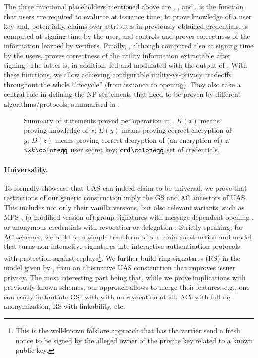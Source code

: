 The three functional placeholders mentioned above are \fissue, \feval, and
\finsp. \fissue is the function that users are required to evaluate at issuance
time, to prove knowledge of a user key and, potentially, claims over attributes
in previously obtained credentials. \feval is computed at signing time by the
user, and controls and proves correctness of the information learned by
verifiers. Finally, \finsp, although  computed also at signing time by the
users, proves correctness of the utility information extractable after signing.
The latter is, in addition, fed and modulated with the output of \feval. With
these functions, we allow achieving configurable utility-vs-privacy tradeoffs
throughout the whole ``lifecycle'' (from issuance to opening). They also take
a central role in defining the NP statements that need to be proven by different
algorithms/protocols, summarised in .

\begin{figure}[ht!]
  \centering
  \scalebox{0.85}{
    
  }
  \caption{Summary of statements proved per operation in \UAS.
    $K(x)$ means proving knowledge of $x$; $E(y)$ means proving correct
    encryption of $y$; $D(z)$ means proving correct decryption of (an encryption
    of) $z$. $\usk \coloneqq$ user secret key; $\scred \coloneqq$ set of
    credentials.}
  \label{fig:proof-blocks-uas}
\end{figure}

\paragraph{Universality.}
To formally showcase that UAS can indeed claim to be universal, we prove that
restrictions of our generic construction imply the GS and AC ancestors of UAS.
This includes not only their vanilla versions, but also relevant variants,
such as MPS \cite{ngsy22}, (a modified version of) group signatures with
message-dependent opening \cite{seh+12}, or anonymous credentials with
revocation \cite{cks10} or delegation \cite{bcc+09}.
%
Strictly speaking, for AC schemes, we build on a simple transform of our main
construction and model that turns non-interactive signatures into interactive
authentication protocols with protection against replays\footnote{This is
  the well-known folklore approach that has the verifier send a fresh nonce to
  be signed by the alleged owner of the private key related to a known
  public key.}. We further build ring signatures (RS) in the model given by
\cite{bkm06}, from an alternative UAS construction that improves issuer privacy.
%
The most interesting part being that, while we prove implications with
previously known schemes, our approach allows to merge their features: e.g.,
one can easily instantiate GSs with with no revocation at all, ACs
with full de-anonymization, RS with linkability, etc.

